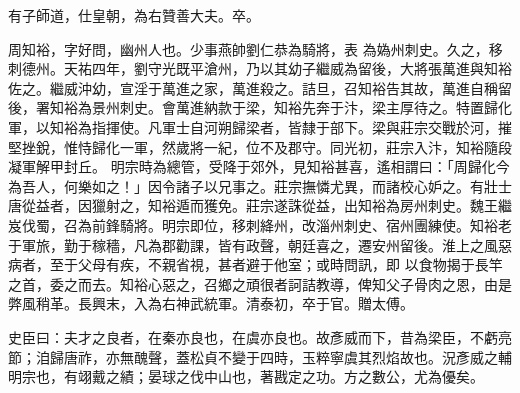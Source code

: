 \begin{pinyinscope}
 有子師道，仕皇朝，為右贊善大夫。卒。



 周知裕，字好問，幽州人也。少事燕帥劉仁恭為騎將，表
 為媯州刺史。久之，移刺德州。天祐四年，劉守光既平滄州，乃以其幼子繼威為留後，大將張萬進與知裕佐之。繼威沖幼，宣淫于萬進之家，萬進殺之。詰旦，召知裕告其故，萬進自稱留後，署知裕為景州刺史。會萬進納款于梁，知裕先奔于汴，梁主厚待之。特置歸化軍，以知裕為指揮使。凡軍士自河朔歸梁者，皆隸于部下。梁與莊宗交戰於河，摧堅挫銳，惟恃歸化一軍，然歲將一紀，位不及郡守。同光初，莊宗入汴，知裕隨段凝軍解甲封丘。
 明宗時為總管，受降于郊外，見知裕甚喜，遙相謂曰：「周歸化今為吾人，何樂如之！」因令諸子以兄事之。莊宗撫憐尤異，而諸校心妒之。有壯士唐從益者，因獵射之，知裕遁而獲免。莊宗遂誅從益，出知裕為房州刺史。魏王繼岌伐蜀，召為前鋒騎將。明宗即位，移刺絳州，改淄州刺史、宿州團練使。知裕老于軍旅，勤于稼穡，凡為郡勸課，皆有政聲，朝廷喜之，遷安州留後。淮上之風惡病者，至于父母有疾，不親省視，甚者避于他室；或時問訊，即
 以食物揭于長竿之首，委之而去。知裕心惡之，召鄉之頑很者訶詰教導，俾知父子骨肉之恩，由是弊風稍革。長興末，入為右神武統軍。清泰初，卒于官。贈太傅。



 史臣曰：夫才之良者，在秦亦良也，在虞亦良也。故彥威而下，昔為梁臣，不虧亮節；洎歸唐祚，亦無醜聲，蓋松貞不變于四時，玉粹寧虞其烈焰故也。況彥威之輔明宗也，有翊戴之績；晏球之伐中山也，著戡定之功。方之數公，尤為優矣。



\end{pinyinscope}
